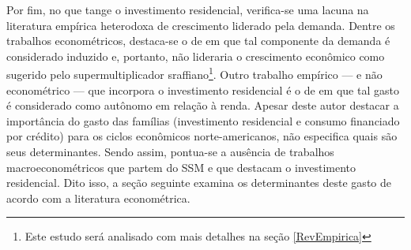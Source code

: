 
Por fim, no que tange o investimento residencial, verifica-se uma lacuna na literatura empírica heterodoxa de crescimento liderado pela demanda. 
Dentre os trabalhos econométricos, destaca-se o de \textcite{arestis_residential_2015} em que tal componente da demanda é considerado induzido e, portanto, não lideraria o crescimento econômico como sugerido pelo supermultiplicador sraffiano\footnote{Este estudo será analisado com mais detalhes na seção \ref{RevEmpirica}}.
Outro trabalho empírico --- e não econométrico --- que incorpora o investimento residencial é o de \textcite{fiebiger_semi-autonomous_2018} em que tal gasto é considerado como autônomo em relação à renda.
Apesar deste autor destacar a importância do gasto das famílias (investimento residencial e consumo financiado por crédito) para os ciclos econômicos norte-americanos, não especifica quais são seus determinantes.
Sendo assim, pontua-se a ausência de trabalhos macroeconométricos que partem do SSM e que destacam o investimento residencial.
Dito isso, a seção seguinte examina os determinantes deste gasto de acordo com a literatura econométrica.  


\begin{comment}
\textcite{deleidi_mission-oriented_2019}, por sua vez, estimam um SVAR para analisar
se o tipo de política fiscal adotada tem impactos sobre o crescimento no caso americano para o período de 1947 a 2018. Em linhas gerais, concluem que gastos orientados em setores mais intensivos em P\&D e em mudanças estrutuais (correspondente ao gasto v) possuem efeitos maiores sobre a taxa de crescimento do que uma política centrada apenas em incentivos fiscais. 

Vale retomar a compatibilidade do investimento residencial com o modelo do supermultiplicador sraffiano uma vez que (i) não cria   capacidade produtiva ao setor privado e (ii) pelas hipotecas serem a principal forma de financiamento (e não salários) de acordo com o \textit{Survey of Construction} \cite{us_census_bureau_characteristics_2017}. 
\end{comment}